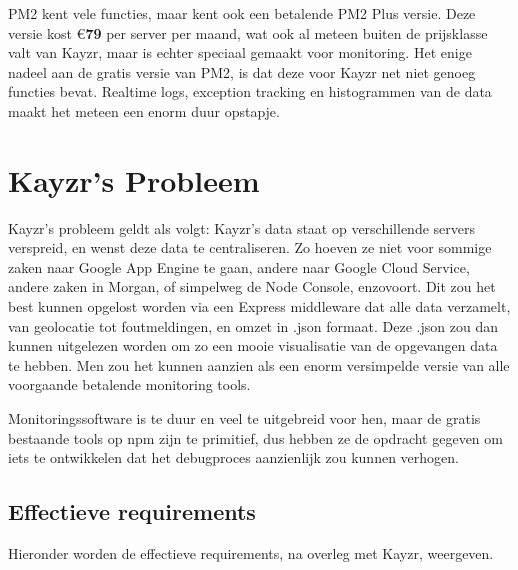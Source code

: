 PM2 kent vele functies, maar kent ook een betalende PM2 Plus versie. Deze versie kost \euro\textbf{79} per server per maand, wat ook al meteen buiten de prijsklasse valt van Kayzr, maar is echter speciaal gemaakt voor monitoring. Het enige nadeel aan de gratis versie van PM2, is dat deze voor Kayzr net niet genoeg functies bevat. Realtime logs, exception tracking en histogrammen van de data maakt het meteen een enorm duur opstapje.

\section{Kayzr's Probleem}
\label{sec:kayzrProblem}

Kayzr's probleem geldt als volgt: Kayzr's data staat op verschillende servers verspreid, en wenst deze data te centraliseren. Zo hoeven ze niet voor sommige zaken naar Google App Engine te gaan, andere naar Google Cloud Service, andere zaken in Morgan, of simpelweg de Node Console, enzovoort. Dit zou het best kunnen opgelost worden via een Express middleware dat alle data verzamelt, van geolocatie tot foutmeldingen, en omzet in .json formaat. Deze .json zou dan kunnen uitgelezen worden om zo een mooie visualisatie van de opgevangen data te hebben. Men zou het kunnen aanzien als een enorm versimpelde versie van alle voorgaande betalende monitoring tools. 

Monitoringssoftware is te duur en veel te uitgebreid voor hen, maar de gratis bestaande tools op npm zijn te primitief, dus hebben ze de opdracht gegeven om iets te ontwikkelen dat het debugproces aanzienlijk zou kunnen verhogen. 

\subsection{Effectieve requirements}
\label{sec:requirements}

Hieronder worden de effectieve requirements, na overleg met Kayzr, weergeven.


